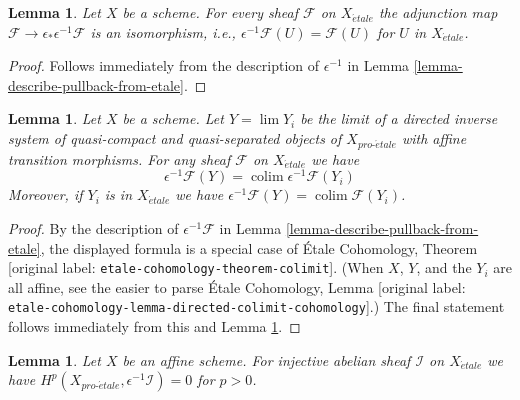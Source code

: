 \documentclass[10pt,a4paper]{article}
\theoremstyle{plain}
\newtheorem{lemma}[subsection]{Lemma}
\theoremstyle{definition}
\theoremstyle{remark}
\numberwithin{equation}{subsection}
\def\lim{\mathop{\mathrm{lim}}\nolimits}
\def\colim{\mathop{\mathrm{colim}}\nolimits}
\def\proetale{{pro\text{-}\acute{e}tale}}
\def\etale{{\acute{e}tale}}
\begin{document}
\begin{lemma}
\label{lemma-fully-faithful}
Let $X$ be a scheme. For every sheaf $\mathcal{F}$ on $X_\etale$
the adjunction map $\mathcal{F} \to \epsilon_*\epsilon^{-1}\mathcal{F}$ is an
isomorphism, i.e., $\epsilon^{-1}\mathcal{F}(U) = \mathcal{F}(U)$
for $U$ in $X_\etale$.
\end{lemma}

\begin{proof}
Follows immediately from the description of
$\epsilon^{-1}$ in Lemma \ref{lemma-describe-pullback-from-etale}.
\end{proof}

\begin{lemma}
\label{lemma-limit-pullback}
Let $X$ be a scheme. Let $Y = \lim Y_i$ be the limit of a directed inverse
system of quasi-compact and quasi-separated objects of $X_\proetale$
with affine transition morphisms. For any sheaf $\mathcal{F}$ on $X_\etale$
we have
$$
\epsilon^{-1}\mathcal{F}(Y) = \colim \epsilon^{-1}\mathcal{F}(Y_i)
$$
Moreover, if $Y_i$ is in $X_\etale$ we have
$\epsilon^{-1}\mathcal{F}(Y) = \colim \mathcal{F}(Y_i)$.
\end{lemma}

\begin{proof}
By the description of $\epsilon^{-1}\mathcal{F}$ in
Lemma \ref{lemma-describe-pullback-from-etale}, the displayed formula
is a special case of \'Etale Cohomology, Theorem
\textnormal{[original label: \nolinkurl{etale-cohomology-theorem-colimit}]}.
(When $X$, $Y$, and the $Y_i$ are all affine, see
the easier to parse \'Etale Cohomology, Lemma
\textnormal{[original label: \nolinkurl{etale-cohomology-lemma-directed-colimit-cohomology}]}.)
The final statement follows immediately from this
and Lemma \ref{lemma-fully-faithful}.
\end{proof}

\begin{lemma}
\label{lemma-affine-vanishing}
Let $X$ be an affine scheme. For injective abelian sheaf $\mathcal{I}$ on
$X_\etale$ we have $H^p(X_\proetale, \epsilon^{-1}\mathcal{I}) = 0$
for $p > 0$.
\end{lemma}
\end{document}
